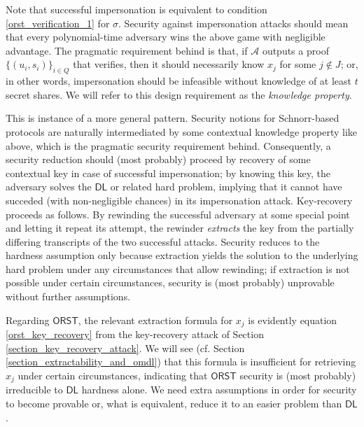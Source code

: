 \documentclass{iacrtrans}
\begin{document}
\noindent
Note that successful impersonation is equivalent
to condition \eqref{orst_verification_1} for $\sigma$.
Security against impersonation attacks should mean
that every polynomial-time adversary wins the above game
with negligible advantage.
The pragmatic requirement behind is that,
if $\mathcal{A}$ outputs a proof
$\{(u_i, s_i)\}_{i \in Q}$ that verifies,
then it should necessarily know $x_j$ for some $j \not \in J$;
or, in other words,
impersonation should be infeasible
without knowledge of at least $t$ secret shares.
We will refer to this design requirement
as the \textit{knowledge property}.

This is instance of a more general pattern.
Security notions for Schnorr-based protocols
are naturally intermediated by some
contextual knowledge property like above,
which is the pragmatic security requirement behind.
Consequently,
a security reduction should (most probably)
proceed by recovery
of some contextual key in case of successful impersonation;
by knowing this key, the adversary solves
the $\mathsf{DL}$ or related hard problem,
implying that it cannot have succeded
(with non-negligible chances) in its impersonation attack.
Key-recovery proceeds as follows.
By rewinding the successful adversary
at some special point and letting it repeat
its attempt,
the rewinder \textit{extracts} the key
from the partially differing transcripts
of the two successful attacks.
Security reduces to the hardness assumption only because
extraction yields the solution to the underlying hard problem
under any circumstances that allow rewinding;
if extraction is not possible under certain circumstances,
security is (most probably)
unprovable without further assumptions.

Regarding $\mathsf{ORST}$,
the relevant extraction formula for $x_j$
is evidently equation \eqref{orst_key_recovery}
from the key-recovery attack
of Section \ref{section_key_recovery_attack}.
We will see
(cf. Section \ref{section_extractability_and_omdl})
that this formula is insufficient for retrieving $x_j$
under certain circumstances,
indicating that $\mathsf{ORST}$ security
is (most probably) irreducible
to $\mathsf{DL}$ hardness alone.
We need extra assumptions in order
for security to become provable
or, what is equivalent,
reduce it to an easier problem than $\mathsf{DL}$.
\end{document}
